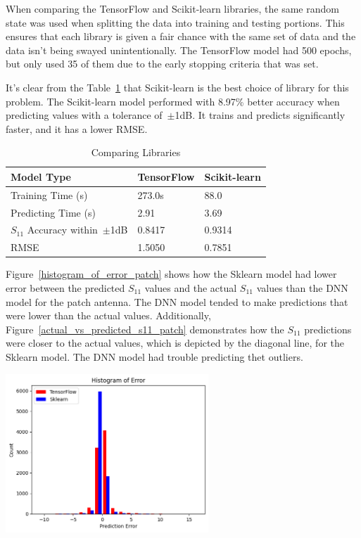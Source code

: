 \documentclass[lettersize,journal]{IEEEtran}
\newenvironment{Figure}
    {\par\medskip\noindent\minipage{\linewidth}}
    {\endminipage\par\medskip}
\begin{document}
When comparing the TensorFlow and Scikit-learn libraries, the same random state was used when splitting the data into training and testing portions. This ensures that each library is given a fair chance with the same set of data and the data isn't being swayed unintentionally. The TensorFlow model had 500 epochs, but only used 35 of them due to the early stopping criteria that was set. 

It's clear from the Table~\ref{comparing_libraries} that Scikit-learn is the best choice of library for this problem. The Scikit-learn model performed with 8.97\% better accuracy when predicting values with a tolerance of~$\pm$1dB. It trains and predicts significantly faster, and it has a lower RMSE.

\begin{table}[h]
\caption{Comparing Libraries}
\begin{center}
\begin{tabular}{ |l|l|l| }
    \hline
    Model Type & TensorFlow & Scikit-learn \\ 
    \hline
    Training Time (s) & 273.0s & 88.0 \\  
    \hline
    Predicting Time (s) & 2.91 & 3.69 \\
    \hline
    $S_{11}$ Accuracy within~$\pm$1dB & 0.8417 & 0.9314 \\
    \hline
    RMSE & 1.5050 & 0.7851 \\
    \hline
\end{tabular}
\end{center}
\label{comparing_libraries}
\end{table}

Figure~\ref{histogram_of_error_patch} shows how the Sklearn model had lower error between the predicted $S_{11}$ values and the actual $S_{11}$ values than the DNN model for the patch antenna. The DNN model tended to make predictions that were lower than the actual values. Additionally, Figure~\ref{actual_vs_predicted_s11_patch} demonstrates how the $S_{11}$ predictions were closer to the actual values, which is depicted by the diagonal line, for the Sklearn model. The DNN model had trouble predicting thet outliers. 

\begin{Figure}
    \centering
    \includegraphics[width=3in]{histogram_patch}
    \label{histogram_of_error_patch}
\end{Figure}
\end{document}
